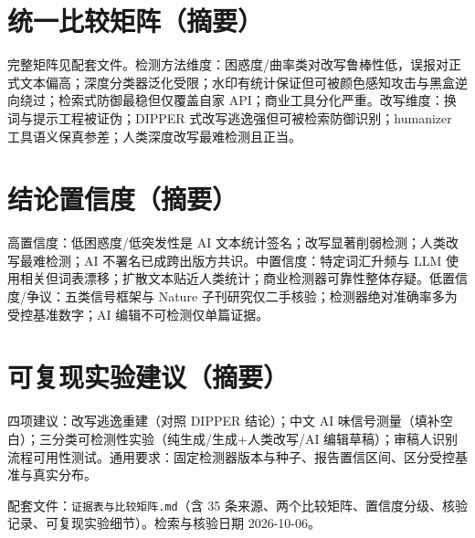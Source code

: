 \documentclass[10pt,a4paper]{ctexart}
\begin{document}
\section{统一比较矩阵（摘要）}
完整矩阵见配套文件。检测方法维度：困惑度/曲率类对改写鲁棒性低，误报对正式文本偏高；深度分类器泛化受限；水印有统计保证但可被颜色感知攻击与黑盒逆向绕过；检索式防御最稳但仅覆盖自家 API；商业工具分化严重。改写维度：换词与提示工程被证伪；DIPPER 式改写逃逸强但可被检索防御识别；humanizer 工具语义保真参差；人类深度改写最难检测且正当。

\section{结论置信度（摘要）}
高置信度：低困惑度/低突发性是 AI 文本统计签名；改写显著削弱检测；人类改写最难检测；AI 不署名已成跨出版方共识。中置信度：特定词汇升频与 LLM 使用相关但词表漂移；扩散文本贴近人类统计；商业检测器可靠性整体存疑。低置信度/争议：五类信号框架与 Nature 子刊研究仅二手核验；检测器绝对准确率多为受控基准数字；AI 编辑不可检测仅单篇证据。

\section{可复现实验建议（摘要）}
四项建议：改写逃逸重建（对照 DIPPER 结论）；中文 AI 味信号测量（填补空白）；三分类可检测性实验（纯生成/生成+人类改写/AI 编辑草稿）；审稿人识别流程可用性测试。通用要求：固定检测器版本与种子、报告置信区间、区分受控基准与真实分布。

\vspace{10pt}
\noindent 配套文件：\texttt{证据表与比较矩阵.md}（含 35 条来源、两个比较矩阵、置信度分级、核验记录、可复现实验细节）。检索与核验日期 2026-10-06。
\end{document}
